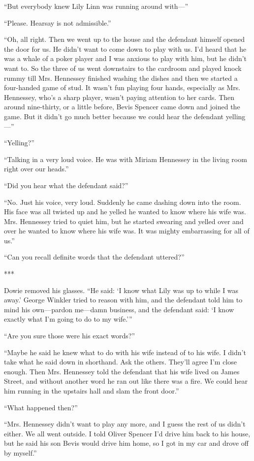 {“But everybody knew Lily Linn was running around with—”

“Please. Hearsay is not admissible.”

“Oh, all right. Then we went up to the house and the defendant himself opened the door for us. He didn’t want to come down to play with us. I’d heard that he was a whale of a poker player and I was anxious to play with him, but he didn’t want to. So the three of us went downstairs to the cardroom and played knock rummy till Mrs. Hennessey finished washing the dishes and then we started a four-handed game of stud. It wasn’t fun playing four hands, especially as Mrs. Hennessey, who’s a sharp player, wasn’t paying attention to her cards. Then around nine-thirty, or a little before, Bevis Spencer came down and joined the game. But it didn’t go much better because we could hear the defendant yelling—”

“Yelling?”

“Talking in a very loud voice. He was with Miriam Hennessey in the living room right over our heads.”

“Did you hear what the defendant said?”

“No. Just his voice, very loud. Suddenly he came dashing down into the room. His face was all twisted up and he yelled he wanted to know where his wife was. Mrs. Hennessey tried to quiet him, but he started swearing and yelled over and over he wanted to know where his wife was. It was mighty embarrassing for all of us.”

“Can you recall definite words that the defendant uttered?”

***

Dowie removed his glasses. “He said: ‘I know what Lily was up to while I was away.’ George Winkler tried to reason with him, and the defendant told him to mind his own—pardon me—damn business, and the defendant said: ‘I know exactly what I’m going to do to my wife.’”

“Are you sure those were his exact words?”

“Maybe he said he knew what to do with his wife instead of to his wife. I didn’t take what he said down in shorthand. Ask the others. They’ll agree I’m close enough. Then Mrs. Hennessey told the defendant that his wife lived on James Street, and without another word he ran out like there was a fire. We could hear him running in the upstairs hall and slam the front door.”

“What happened then?”

“Mrs. Hennessey didn’t want to play any more, and I guess the rest of us didn’t either. We all went outside. I told Oliver Spencer I’d drive him back to his house, but he said his son Bevis would drive him home, so I got in my car and drove off by myself.”

}
